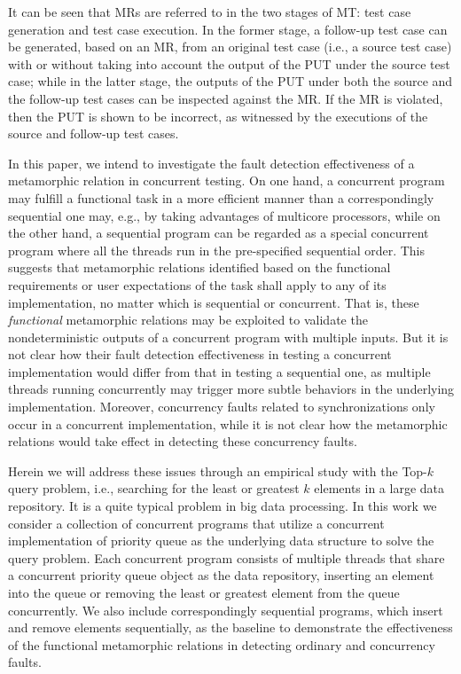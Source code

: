 \documentclass[conference]{IEEEtran}
\theoremstyle{remark}
\begin{document}
It can be seen that MRs are referred to in the two stages of MT: test case generation and test case execution. In the former stage, a follow-up test case can be generated, based on an MR, from an original test case (i.e., a source test case) with or without taking into account the output of the PUT under the source test case; while in the latter stage, the outputs of the PUT under both the source and the follow-up test cases can be inspected against the MR. If the MR is violated, then the PUT is shown to be incorrect, as witnessed by the executions of the source and follow-up test cases.

In this paper, we intend to investigate the fault detection effectiveness of a metamorphic relation in concurrent testing. On one hand, a concurrent program may fulfill a functional task in a more efficient manner than a correspondingly sequential one may, e.g., by taking advantages of multicore processors, while on the other hand, a sequential program can be regarded as a special concurrent program where all the threads run in the pre-specified sequential order. This suggests that metamorphic relations identified based on the functional requirements or user expectations of the task shall apply to any of its implementation, no matter which is sequential or concurrent. That is, these \emph{functional} metamorphic relations may be exploited to validate the nondeterministic outputs of a concurrent program with multiple inputs. But it is not clear how their fault detection effectiveness in testing a concurrent implementation would differ from that in testing a sequential one, as multiple threads running concurrently may trigger more subtle behaviors in the underlying implementation. Moreover, concurrency faults related to synchronizations only occur in a concurrent implementation, while it is not clear how the metamorphic relations would take effect in detecting these concurrency faults. 

Herein we will address these issues through an empirical study with the Top-$k$ query problem, i.e., searching for the least or greatest $k$ elements in a large data repository. It is a quite typical problem in big data processing. In this work we consider a collection of concurrent programs that utilize a concurrent implementation of priority queue as the underlying data structure to solve the query problem. Each concurrent program consists of multiple threads that share a concurrent priority queue object as the data repository, inserting an element into the queue or removing the least or greatest element from the queue concurrently. We also include correspondingly sequential programs, which insert and remove elements sequentially, as the baseline to demonstrate the effectiveness of the functional metamorphic relations in detecting ordinary and concurrency faults.
\end{document}
